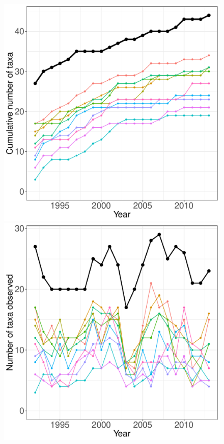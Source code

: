 \documentclass[11pt, oneside]{article}
\begin{document}
\begin{figure}[h!]
\centering
\includegraphics[scale = 0.4]{sev-grasshopper-compagnoni_species_accumulation_curve.pdf}
\includegraphics[scale = 0.4]{sev-grasshopper-compagnoni_num_taxa_over_time.pdf}

\end{figure}
\end{document}
